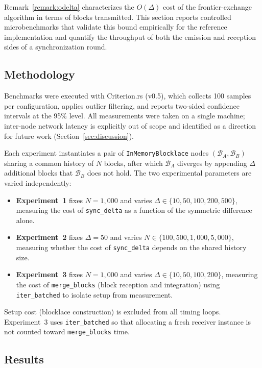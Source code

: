 \documentclass[12pt]{article}
\begin{document}
	Remark~\ref{remark:odelta} characterizes the $O(\Delta)$ cost of the
	frontier-exchange algorithm in terms of blocks transmitted. This
	section reports controlled microbenchmarks that validate this bound
	empirically for the reference implementation and quantify the
	throughput of both the emission and reception sides of a
	synchronization round.
	
	\subsection{Methodology}
	
	Benchmarks were executed with Criterion.rs (v0.5), which collects 100
	samples per configuration, applies outlier filtering, and reports
	two-sided confidence intervals at the 95\% level. All measurements
	were taken on a single machine; inter-node network latency is
	explicitly out of scope and identified as a direction for future work
	(Section~\ref{sec:discussion}).
	
	Each experiment instantiates a pair of \texttt{InMemoryBlocklace}
	nodes $(\mathcal{B}_A, \mathcal{B}_B)$ sharing a common history of
	$N$ blocks, after which $\mathcal{B}_A$ diverges by appending
	$\Delta$ additional blocks that $\mathcal{B}_B$ does not hold. The
	two experimental parameters are varied independently:
	
	\begin{itemize}[itemsep=2pt]
		\item \textbf{Experiment~1} fixes $N = 1{,}000$ and varies
		$\Delta \in \{10, 50, 100, 200, 500\}$, measuring the cost of
		\texttt{sync\_delta} as a function of the symmetric difference
		alone.
		\item \textbf{Experiment~2} fixes $\Delta = 50$ and varies
		$N \in \{100, 500, 1{,}000, 5{,}000\}$, measuring whether the
		cost of \texttt{sync\_delta} depends on the shared history size.
		\item \textbf{Experiment~3} fixes $N = 1{,}000$ and varies
		$\Delta \in \{10, 50, 100, 200\}$, measuring the cost of
		\texttt{merge\_blocks} (block reception and integration) using
		\texttt{iter\_batched} to isolate setup from measurement.
	\end{itemize}
	
	Setup cost (blocklace construction) is excluded from all timing
	loops. Experiment~3 uses \texttt{iter\_batched} so that allocating a
	fresh receiver instance is not counted toward \texttt{merge\_blocks}
	time.
	
	\subsection{Results}
	
\end{document}
